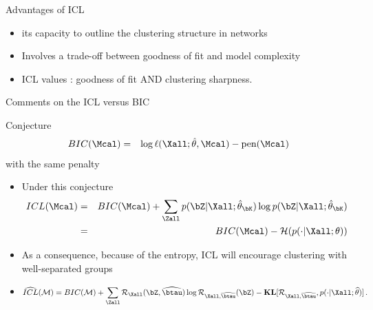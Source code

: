 \documentclass[compress,10pt]{beamer}
\begin{document}
\begin{frame}{Advantages of ICL}


 
\begin{itemize}
\item its capacity to outline the clustering structure in networks%
\item Involves a trade-off between goodness of fit and model complexity
\item ICL values :   goodness of fit  AND clustering  sharpness.
 
\end{itemize}

\end{frame}

 



 \begin{frame}{Comments on the   ICL versus BIC}

\begin{block}{Conjecture}
\begin{eqnarray*}
 BIC(\Mcal)  &=&  \log \ell(\Xall; \hat{\theta}, \Mcal) - \mbox{pen}(\Mcal)
\end{eqnarray*}
with the same penalty
 \end{block}

\begin{itemize}
\item Under this conjecture
\begin{eqnarray*}
 ICL(\Mcal)  &= & BIC(\Mcal)  +   \sum_{\Zall} p(\bZ | \Xall;\hat \theta_{\bK}) \log p(\bZ | \Xall; \hat \theta_{\bK})\\
 &=& BIC(\Mcal)  -   \mathcal{H}( p(\cdot | \Xall; \theta)) 
\end{eqnarray*}
\item As a consequence, because of the entropy,  ICL  will encourage clustering with well-separated groups 
\item 
$$ 
 \widehat{ICL}(\mathcal{M})  =BIC(\mathcal{M})  +   \sum_{\Zall} \mathcal{R}_{\Xall}(\bZ,\widehat{\btau})  \log \mathcal{R}_{\Xall,\widehat{\btau}}({\bZ}) -  \mathbf{KL}[\mathcal{R}_{\Xall,\widehat{\btau}}, p(\cdot | \Xall;\widehat{\theta})]\,. 
$$

\end{itemize}

 
 \end{frame}
 
\end{document}
